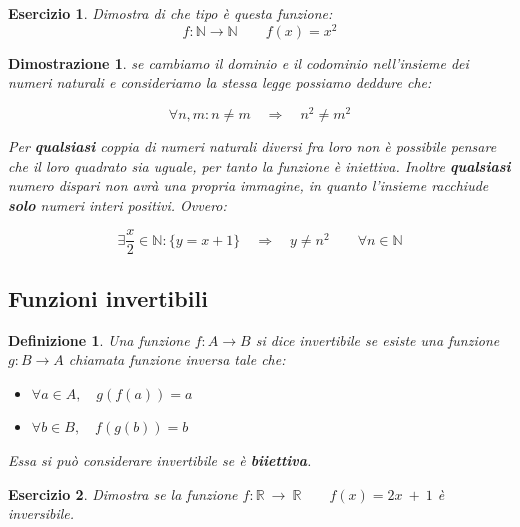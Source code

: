 \documentclass[12pt, a4paper]{article}
\theoremstyle{break}
\newtheorem{defn}{Definizione}
\theoremstyle{lemma}
\newtheorem{eser}{Esercizio}
\theoremstyle{lemma}
\newtheorem{dimo}{Dimostrazione}
\theoremstyle{lemma}
\begin{document}
\begin{eser}
Dimostra di che tipo è questa funzione:
\begin{equation}
  f :\mathbb{N}\rightarrow \mathbb{N} \qquad f(x)=x^2
\end{equation}
\end{eser}

\begin{dimo}
  se cambiamo il dominio e il codominio nell'insieme dei numeri naturali e consideriamo la stessa legge possiamo deddure che:

\begin{equation}
  \forall n,m : n \ne m \quad \Rightarrow \quad n^2 \ne m^2
\end{equation}

\vspace{3.5mm}
Per \textbf{qualsiasi} coppia di numeri naturali diversi fra loro non è possibile pensare che il loro quadrato sia uguale, per tanto la funzione è iniettiva. 
\vspace{2.5mm}
Inoltre \textbf{qualsiasi} numero dispari non avrà una propria immagine, in quanto l'insieme racchiude \textbf{solo} numeri interi positivi. Ovvero:

\begin{equation}
  \exists \frac{x}{2} \in \mathbb{N}: \{y = x + 1\} \quad
  \Rightarrow \quad y \ne n^2 \qquad \forall n\in \mathbb{N}
\end{equation}

\end{dimo}


\subsection{Funzioni invertibili}
\begin{defn} Una funzione $f:A\rightarrow B$ si dice invertibile se esiste una funzione $g: B \rightarrow A$ chiamata funzione inversa tale che:
\begin{itemize}
  \item $\forall a\in A, \quad g(f(a))=a$
  \item $\forall b\in B, \quad f(g(b))=b$
\end{itemize}
Essa si può considerare invertibile se è \textbf{biiettiva}.
\end{defn}

\begin{eser}
  Dimostra se la funzione $f: \mathbb{R} \ \rightarrow \ \mathbb{R} \qquad f(x) = 2x\ +\ 1$ è inversibile.
\end{eser}
\end{document}

